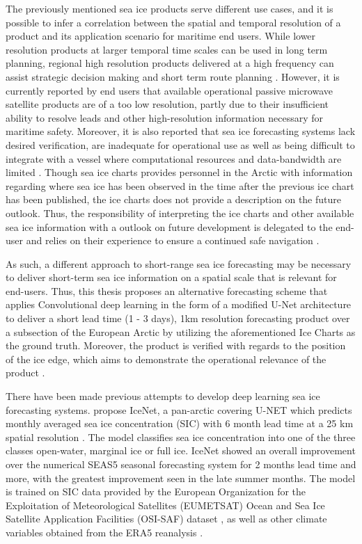 \documentclass[../main/thesis.tex]{subfiles}
\begin{document}
The previously mentioned sea ice products serve different use cases, and it is possible to infer a correlation between the spatial and temporal resolution of a product and its application scenario for maritime end users. While lower resolution products at larger temporal time scales can be used in long term planning, regional high resolution products delivered at a high frequency can assist strategic decision making and short term route planning \citep{Wagner2020}. However, it is currently reported by end users that available operational passive microwave satellite products are of a too low resolution, partly due to their insufficient ability to resolve leads and other high-resolution information necessary for maritime safety. Moreover, it is also reported that sea ice forecasting systems lack desired verification, are inadequate for operational use as well as being difficult to integrate with a vessel where computational resources and data-bandwidth are limited \citep{Veland2021}. Though sea ice charts provides personnel in the Arctic with information regarding where sea ice has been observed in the time after the previous ice chart has been published, the ice charts does not provide a description on the future outlook. Thus, the responsibility of interpreting the ice charts and other available sea ice information with a outlook on future development is delegated to the end-user and relies on their experience to ensure a continued safe navigation \citep{Veland2021}.

As such, a different approach to short-range sea ice forecasting may be necessary to deliver short-term sea ice information on a spatial scale that is relevant for end-users. Thus, this thesis proposes an alternative forecasting scheme that applies Convolutional deep learning in the form of a modified U-Net architecture \citep{Ronneberger2015} to deliver a short lead time (1 - 3 days), 1km resolution forecasting product over a subsection of the European Arctic by utilizing the aforementioned Ice Charts as the ground truth. Moreover, the product is verified with regards to the position of the ice edge, which aims to demonstrate the operational relevance of the product \citep{Veland2021, Melsom2019}. 

There have been made previous attempts to develop deep learning sea ice forecasting systems. \citet{Andersson2021} propose IceNet, a pan-arctic covering U-NET which predicts monthly averaged sea ice concentration (SIC) with 6 month lead time at a 25 km spatial resolution \citep{Andersson2021}. The model classifies sea ice concentration into one of the three classes open-water, marginal ice or full ice. IceNet showed an overall improvement over the numerical SEAS5 seasonal forecasting system \citep{Johnson2019} for 2 months lead time and more, with the greatest improvement seen in the late summer months. The model is trained on SIC data provided by the European Organization for the Exploitation of Meteorological Satellites (EUMETSAT) Ocean and Sea Ice Satellite Application Facilities (OSI-SAF) dataset \citep{Lavergne2019}, as well as other climate variables obtained from the ERA5 reanalysis \citep{Hersbach2020}.
\end{document}
